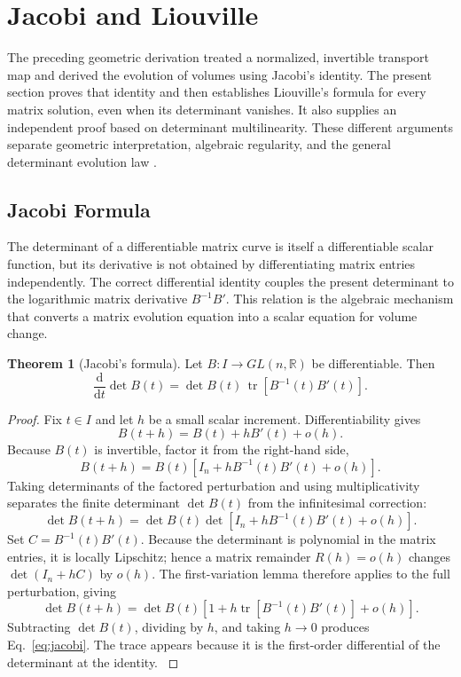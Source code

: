 \documentclass[11pt,a4paper]{article}
\newcommand{\be}{\begin{equation}}
\newcommand{\ee}{\end{equation}}
\newcommand{\lb}[1]{\label{#1}}
\newcommand{\dd}{\mathrm{d}}
\newcommand{\R}{\mathbb{R}}
\DeclareMathOperator{\tr}{tr}
\theoremstyle{definition}
\newtheorem{theorem}{Theorem}[section]
\numberwithin{equation}{section}
\begin{document}
\section{Jacobi and Liouville}
\label{sec:jacobi-liouville}

The preceding geometric derivation treated a normalized, invertible transport map and derived the evolution of volumes using Jacobi's identity. The present section proves that identity and then establishes Liouville's formula for every matrix solution, even when its determinant vanishes. It also supplies an independent proof based on determinant multilinearity. These different arguments separate geometric interpretation, algebraic regularity, and the general determinant evolution law \cite{horn2013,coddington1955,teschl2012}.

\subsection{Jacobi Formula}

The determinant of a differentiable matrix curve is itself a differentiable scalar function, but its derivative is not obtained by differentiating matrix entries independently. The correct differential identity couples the present determinant to the logarithmic matrix derivative $B^{-1}B'$. This relation is the algebraic mechanism that converts a matrix evolution equation into a scalar equation for volume change.

\begin{theorem}[Jacobi's formula]
Let $B:I\rightarrow GL(n,\R)$ be differentiable. Then
\be
\frac{\dd}{\dd t}\det B(t)
=
\det B(t)\,
\tr\left[
B^{-1}(t)B'(t)
\right].
\lb{eq:jacobi}
\ee
\end{theorem}

\begin{proof}
Fix $t\in I$ and let $h$ be a small scalar increment. Differentiability gives
\be
B(t+h)=B(t)+hB'(t)+o(h).
\lb{eq:B-expand}
\ee
Because $B(t)$ is invertible, factor it from the right-hand side,
\be
B(t+h)
=
B(t)
\left[
I_n+hB^{-1}(t)B'(t)+o(h)
\right].
\lb{eq:B-factor}
\ee
Taking determinants of the factored perturbation and using multiplicativity separates the finite determinant $\det B(t)$ from the infinitesimal correction:
\be
\det B(t+h)
=
\det B(t)
\det\left[
I_n+hB^{-1}(t)B'(t)+o(h)
\right].
\lb{eq:det-factor}
\ee
Set $C=B^{-1}(t)B'(t)$. Because the determinant is polynomial in the matrix entries, it is locally Lipschitz; hence a matrix remainder $R(h)=o(h)$ changes $\det(I_n+hC)$ by $o(h)$. The first-variation lemma therefore applies to the full perturbation, giving
\be
\det B(t+h)
=
\det B(t)
\left[1+h\tr\left[B^{-1}(t)B'(t)\right]+o(h)
\right].
\lb{eq:det-expand}
\ee
Subtracting $\det B(t)$, dividing by $h$, and taking $h\rightarrow0$ produces Eq.~\eqref{eq:jacobi}. The trace appears because it is the first-order differential of the determinant at the identity. \cite{horn2013}
\end{proof}
\end{document}
